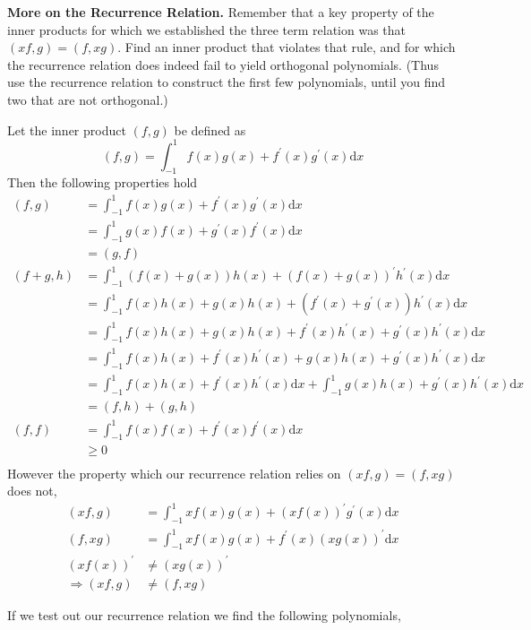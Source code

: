 \textbf{More on the Recurrence Relation.} Remember that a key property
of the inner products for which we established the three term relation
was that $(xf,g) = (f,xg)$. Find an inner product that violates that
rule, and for which the recurrence relation does indeed fail to yield
orthogonal polynomials. (Thus use the recurrence relation to construct
the first few polynomials, until you find two that are not orthogonal.)

{\color{blue}
Let the inner product $(f,g)$ be defined as
\[
(f,g) = \int_{-1}^1 f(x)g(x) + f^\prime(x) g^\prime(x) \textrm{d}x
\]
Then the following properties hold
\begin{align*}
(f,g) &= \int_{-1}^1 f(x)g(x) + f^\prime(x) g^\prime(x) \textrm{d}x\\
      &= \int_{-1}^1 g(x)f(x) + g^\prime(x) f^\prime(x) \textrm{d}x\\
      &= (g,f)\\
(f+g, h) &= \int_{-1}^1 (f(x) + g(x))h(x) + (f(x) + g(x))^\prime h^\prime(x) \textrm{d}x\\
         &= \int_{-1}^1 f(x)h(x) + g(x)h(x) + (f^\prime(x) + g^\prime(x)) h^\prime(x) \textrm{d}x\\
         &= \int_{-1}^1 f(x)h(x) + g(x)h(x) + f^\prime(x) h^\prime(x) + g^\prime(x) h^\prime(x) \textrm{d}x\\
         &= \int_{-1}^1 f(x)h(x) + f^\prime(x) h^\prime(x) + g(x)h(x) + g^\prime(x) h^\prime(x) \textrm{d}x\\
         &= \int_{-1}^1 f(x)h(x) + f^\prime(x) h^\prime(x) \textrm{d}x
         + \int_{-1}^1 g(x)h(x) + g^\prime(x) h^\prime(x) \textrm{d}x\\
         &= (f,h) + (g,h) \\
(f,f) &= \int_{-1}^1 f(x)f(x) + f^\prime(x) f^\prime(x) \textrm{d}x\\
      &\ge 0 \\
\end{align*}
However the property which our recurrence relation relies on $(xf,g) =
(f, xg)$ does not,
\begin{align*}
(xf,g) &= \int_{-1}^1 xf(x)g(x) + (xf(x))^\prime g^\prime(x) \textrm{d}x\\
(f,xg) &= \int_{-1}^1 xf(x)g(x) + f^\prime(x) (xg(x))^\prime \textrm{d}x\\
(xf(x))^\prime &\ne (xg(x))^\prime\\
\Rightarrow (xf,g) &\ne (f,xg)
\end{align*}

If we test out our recurrence relation we find the following
polynomials,

}

